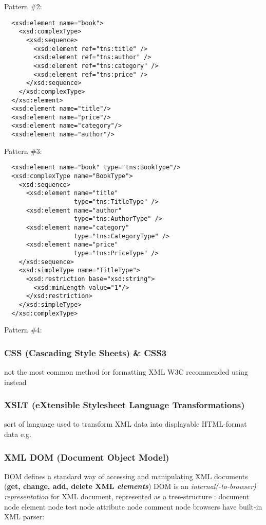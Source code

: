 \documentclass{myproc}
\begin{document}
\w Pattern \#2:  
  \begin{verbatim}
  <xsd:element name="book">
    <xsd:complexType>
      <xsd:sequence>
        <xsd:element ref="tns:title" />
        <xsd:element ref="tns:author" />
        <xsd:element ref="tns:category" />
        <xsd:element ref="tns:price" />
      </xsd:sequence>
    </xsd:complexType>
  </xsd:element>
  <xsd:element name="title"/>
  <xsd:element name="price"/>
  <xsd:element name="category"/>
  <xsd:element name="author"/>
  \end{verbatim}
\w Pattern \#3:  
  \begin{verbatim}
  <xsd:element name="book" type="tns:BookType"/>
  <xsd:complexType name="BookType">
    <xsd:sequence>
      <xsd:element name="title" 
                   type="tns:TitleType" />
      <xsd:element name="author" 
                   type="tns:AuthorType" />
      <xsd:element name="category" 
                   type="tns:CategoryType" />
      <xsd:element name="price" 
                   type="tns:PriceType" />
    </xsd:sequence>
    <xsd:simpleType name="TitleType">
      <xsd:restriction base="xsd:string">
        <xsd:minLength value="1"/>
      </xsd:restriction>
    </xsd:simpleType>
  </xsd:complexType>
  \end{verbatim}
\w Pattern \#4:  
\eit

\subsubsection{CSS (Cascading Style Sheets) \& CSS3}
\bit
\w not the most common method for formatting XML
\w W3C recommended using  instead
\eit

\subsubsection{XSLT (eXtensible Stylesheet Language Transformations)}
\bit
\w sort of language used to transform XML data into displayable HTML-format
data
\w e.g.

\eit

\subsubsection{XML DOM (Document Object Model)}
\bit
\w DOM defines a standard way of accessing and manipulating XML documents
 ({\bf get, change, add, delete XML {\em elements\/}})
\w DOM is an {\em internal(-to-browser) representation\/} for XML document, represented as
a tree-structure 
\w {}:
  \bit
  \w document node
  \w element node
  \w test node
  \w attribute node
  \w comment node
  \eit
\w browsers have built-in XML parser: 
   \bit
   \w {}
   \eit
\eit
\end{document}
